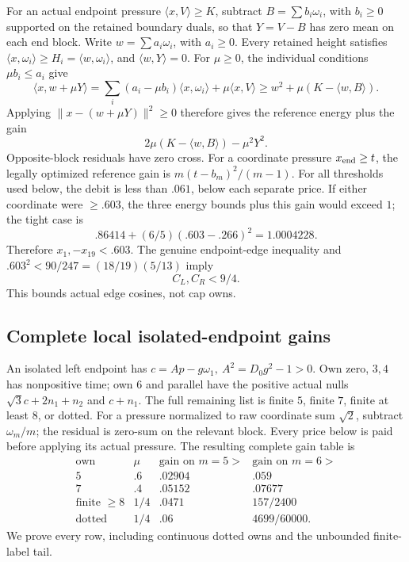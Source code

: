 \documentclass[11pt]{article}
\theoremstyle{definition}
\theoremstyle{remark}
\newcommand{\ip}[2]{\langle #1,#2\rangle}
\newcommand{\norm}[1]{\lVert #1\rVert}
\begin{document}
For an actual endpoint pressure \(\ip{x}{V}\geq K\),
subtract \(B=\sum b_i\omega_i\), with \(b_i\geq0\) supported
on the retained boundary duals, so that \(Y=V-B\) has zero mean
on each end block. Write \(w=\sum a_i\omega_i\), with \(a_i\geq0\).
Every retained height satisfies \(\ip x{\omega_i}\geq H_i
=\ip w{\omega_i}\), and \(\ip wY=0\).
For \(\mu\geq0\), the individual conditions \(\mu b_i\leq a_i\)
give
\[
 \ip x{w+\mu Y}
 =\sum_i(a_i-\mu b_i)\ip x{\omega_i}+\mu\ip xV
 \geq w^2+\mu(K-\ip wB).
\]
Applying \(\norm{x-(w+\mu Y)}^2\geq0\) therefore gives the
reference energy plus the gain
\[
 2\mu(K-\ip{w}{B})-\mu^2Y^2.
\]
Opposite-block residuals have zero cross.
For a coordinate pressure \(x_{\rm end}\geq t\),
the legally optimized reference gain is
\(m(t-b_m)^2/(m-1)\).
For all thresholds used below, the debit is
less than \(.061\), below each separate price.
If either coordinate were \(\geq.603\), the
three energy bounds plus this gain would exceed
\(1\); the tight case is
\[
 .86414+(6/5)(.603-.266)^2=1.0004228.
\]
Therefore \(x_1,-x_{19}<.603\).
The genuine endpoint-edge inequality and
\(.603^2<90/247=(18/19)(5/13)\) imply
\begin{equation}\label{app:eq:A18shortends}
 C_L,C_R<9/4.
\end{equation}
This bounds actual edge cosines, not cap owns.

\subsection{Complete local isolated-endpoint gains}
An isolated left endpoint has
\(c=A p-g\omega_1,\ A^2=D_0g^2-1>0\).
Own zero, \(3,4\) has nonpositive time; own
\(6\) and parallel have the positive actual
nulls \(\sqrt3c+2n_1+n_2\) and \(c+n_1\).
The full remaining list is finite \(5\), finite
\(7\), finite at least \(8\), or dotted.
For a pressure normalized to raw coordinate
sum \(\sqrt2\), subtract \(\omega_m/m\);
the residual is zero-sum on the relevant block.
Every price below is paid before applying its
actual pressure. The resulting complete gain
table is
\[
\begin{array}{c|c|c|c}
\text{own}&\mu&\text{gain on }m=5>&
 \text{gain on }m=6>\\ \hline
5&.6&.02904&.059\\
7&.4&.05152&.07677\\
\text{finite }\geq8&1/4&.0471&157/2400\\
\text{dotted}&1/4&.06&4699/60000.
\end{array}
\]
We prove every row, including continuous dotted
owns and the unbounded finite-label tail.
\end{document}
